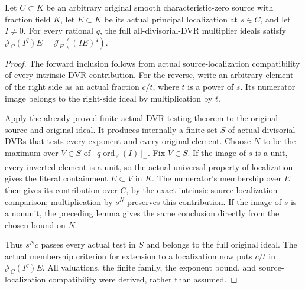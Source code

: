\begin{theorem}\label{thm:sc0-full-multiplier-away-localization}
\leanok
{}
Let $C\subset K$ be an arbitrary original smooth characteristic-zero
source with fraction field $K$, let $E\subset K$ be its actual
principal localization at $s\in C$, and let $I\ne0$. For every rational $q$,
the full all-divisorial-DVR multiplier ideals satisfy
$\mathcal J_C(I^q)E=\mathcal J_E((IE)^q)$.
\end{theorem}
\begin{proof}
The forward inclusion follows from actual source-localization
compatibility of every intrinsic DVR contribution. For the reverse,
write an arbitrary element of the right side as an actual fraction
$c/t$, where $t$ is a power of $s$. Its numerator image belongs to
the right-side ideal by multiplication by $t$.

Apply the already proved finite actual DVR testing theorem to the
original source and original ideal. It produces internally a finite
set $S$ of actual divisorial DVRs that tests every exponent and every
original element. Choose $N$ to be the maximum over $V\in S$ of
$\lfloor q\operatorname{ord}_V(I)\rfloor_+$. Fix $V\in S$. If the
image of $s$ is a unit, every inverted element is a unit, so the actual
universal property of localization gives the literal containment
$E\subset V$ in $K$. The numerator's membership over $E$ then gives
its contribution over $C$, by the exact intrinsic source-localization
comparison; multiplication by $s^N$ preserves this contribution.
If the image of $s$ is a nonunit, the preceding lemma gives the same
conclusion directly from the chosen bound on $N$.

Thus $s^Nc$ passes every actual test in $S$ and belongs to the full
original ideal. The actual membership criterion for extension to a
localization now puts $c/t$ in $\mathcal J_C(I^q)E$. All valuations,
the finite family, the exponent bound, and source-localization
compatibility were derived, rather than assumed.
\end{proof}
